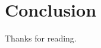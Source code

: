 \documentclass[./main]{subfiles}
\begin{document}
\section{Conclusion}
Thanks for reading.

\end{document}
